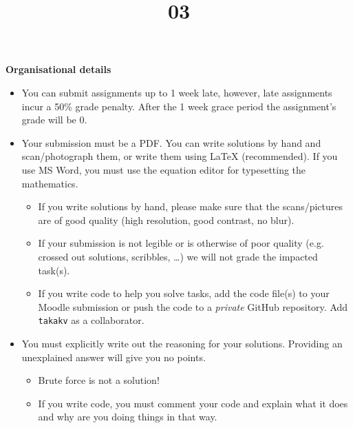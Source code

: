 \documentclass{homework}
\title{03}
\date{\DTMdate{2024-12-06}}
\begin{document}
\maketitle

\textbf{Organisational details}
\begin{itemize}
  \item You can submit assignments up to 1 week late, however, late assignments incur a 50\% grade penalty.
  After the 1 week grace period the assignment's grade will be 0.
  \item Your submission must be a PDF.
  You can write solutions by hand and scan/photograph them, or write them using \LaTeX{} (recommended).
  If you use MS Word, you must use the equation editor for typesetting the mathematics.
  \begin{itemize}
    \item If you write solutions by hand, please make sure that the scans/pictures are of good quality (high resolution, good contrast, no blur).
    \item If your submission is not legible or is otherwise of poor quality (e.g. crossed out solutions, scribbles, \dots) we will not grade the impacted task(s).
    \item If you write code to help you solve tasks, add the code file(s) to your Moodle submission or push the code to a \emph{private} GitHub repository.
    Add \texttt{takakv} as a collaborator.
  \end{itemize}
  \item You must explicitly write out the reasoning for your solutions.
  Providing an unexplained answer will give you no points.
  \begin{itemize}
    \item Brute force is not a solution!
    \item If you write code, you must comment your code and explain what it does and why are you doing things in that way.
  \end{itemize}
\end{itemize}

\vspace*{1em}
\end{document}
